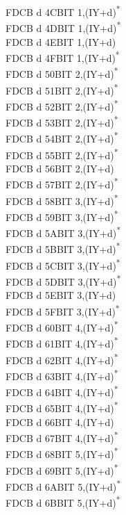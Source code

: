 \documentclass[twoside,openright,a4paper]{book}
\begin{document}
\begin{multicols}{3}
{\begin{tabbing}
	FDCB d 4C\>BIT 1,(IY+d)\textsuperscript{*}\\
	FDCB d 4D\>BIT 1,(IY+d)\textsuperscript{*}\\
	FDCB d 4E\>BIT 1,(IY+d)\\
	FDCB d 4F\>BIT 1,(IY+d)\textsuperscript{*}\\
	FDCB d 50\>BIT 2,(IY+d)\textsuperscript{*}\\
	FDCB d 51\>BIT 2,(IY+d)\textsuperscript{*}\\
	FDCB d 52\>BIT 2,(IY+d)\textsuperscript{*}\\
	FDCB d 53\>BIT 2,(IY+d)\textsuperscript{*}\\
	FDCB d 54\>BIT 2,(IY+d)\textsuperscript{*}\\
	FDCB d 55\>BIT 2,(IY+d)\textsuperscript{*}\\
	FDCB d 56\>BIT 2,(IY+d)\\
	FDCB d 57\>BIT 2,(IY+d)\textsuperscript{*}\\
	FDCB d 58\>BIT 3,(IY+d)\textsuperscript{*}\\
	FDCB d 59\>BIT 3,(IY+d)\textsuperscript{*}\\
	FDCB d 5A\>BIT 3,(IY+d)\textsuperscript{*}\\
	FDCB d 5B\>BIT 3,(IY+d)\textsuperscript{*}\\
	FDCB d 5C\>BIT 3,(IY+d)\textsuperscript{*}\\
	FDCB d 5D\>BIT 3,(IY+d)\textsuperscript{*}\\
	FDCB d 5E\>BIT 3,(IY+d)\\
	FDCB d 5F\>BIT 3,(IY+d)\textsuperscript{*}\\
	FDCB d 60\>BIT 4,(IY+d)\textsuperscript{*}\\
	FDCB d 61\>BIT 4,(IY+d)\textsuperscript{*}\\
	FDCB d 62\>BIT 4,(IY+d)\textsuperscript{*}\\
	FDCB d 63\>BIT 4,(IY+d)\textsuperscript{*}\\
	FDCB d 64\>BIT 4,(IY+d)\textsuperscript{*}\\
	FDCB d 65\>BIT 4,(IY+d)\textsuperscript{*}\\
	FDCB d 66\>BIT 4,(IY+d)\\
	FDCB d 67\>BIT 4,(IY+d)\textsuperscript{*}\\
	FDCB d 68\>BIT 5,(IY+d)\textsuperscript{*}\\
	FDCB d 69\>BIT 5,(IY+d)\textsuperscript{*}\\
	FDCB d 6A\>BIT 5,(IY+d)\textsuperscript{*}\\
	FDCB d 6B\>BIT 5,(IY+d)\textsuperscript{*}\\

\end{tabbing}}
\end{multicols}
\end{document}

